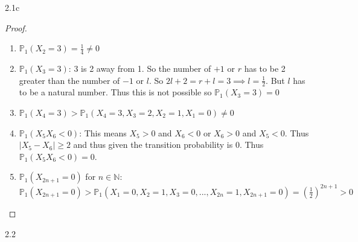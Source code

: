 \documentclass{article}
\newcommand{\PR}{\mathbb{P}}
\newcommand{\N}{\mathbb{N}}
\newcommand{\abs}[1]{\left\lvert #1\right\rvert}
\begin{document}
\begin{PROB}{2.1c}\label{Problem 2.1c.}
\end{PROB}
\begin{proof}
    \begin{enumerate}
        \item $\PR_1(X_2 = 3) = \frac{1}{4} \neq 0$
        \item $\PR_1(X_3 = 3)$: 3 is 2 away from 1. So the number of $+1$ or $r$ has to be 2 greater than the number of $-1$ or $l$. So $2l + 2 = r + l = 3 \implies l = \frac{1}{2}$. But $l$ has to be a natural number. Thus this is not possible so $\PR_1(X_3 = 3) = 0$
        \item $\PR_1(X_4 = 3) > \PR_1(X_4 = 3, X_3 = 2, X_2 = 1, X_1 = 0) \neq 0$          
        \item $\PR_1(X_5 X_6 < 0)$: This means $X_5 > 0$ and $X_6 < 0$ or $X_6 > 0$ and $X_5 < 0$. Thus $\abs{X_5 - X_6} \geq 2$ and thus given the transition probability is 0. Thus $\PR_1(X_5 X_6 < 0) = 0$.
        \item $\PR_1(X_{2n + 1} = 0)$ for $n \in \N$: $\PR_1(X_{2n + 1} = 0) > \PR_1(X_1 = 0, X_{2} = 1, X_{3} = 0, ..., X_{2n} = 1, X_{2n + 1} = 0) = (\frac{1}{2})^{2n + 1} > 0$       
    \end{enumerate}
    
\end{proof}
\begin{PROB}{2.2}\label{Problem 2.2.}
\end{PROB}
\end{document}

